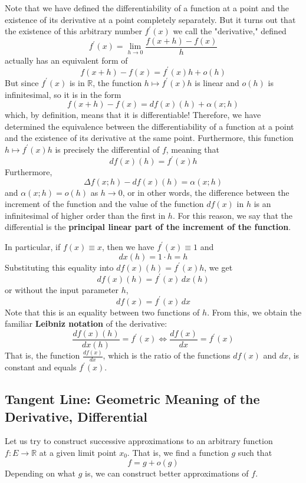   Note that we have defined the differentiability of a function at a point and the existence of its derivative at a point completely separately. But it turns out that the existence of this arbitrary number $f^\prime (x)$ we call the "derivative," defined
  \[f^\prime (x) = \lim_{h \rightarrow 0} \frac{f(x + h) - f(x)}{h}\]
  actually has an equivalent form of 
  \[f(x + h) - f(x) = f^\prime (x) h + o(h)\]
  But since $f^\prime(x)$ is in $\mathbb{R}$, the function $h \mapsto f^\prime (x) h$ is linear and $o(h)$ is infinitesimal, so it is in the form 
  \[f(x + h) - f(x) = df (x) (h) + \alpha(x; h)\]
  which, by definition, means that it is differentiable! Therefore, we have determined the equivalence between the differentiability of a function at a point and the existence of its derivative at the same point. Furthermore, this function $h \mapsto f^\prime (x) h$ is precisely the differential of $f$, meaning that
  \[df (x) (h) = f^\prime (x) h\]
  Furthermore, 
  \[\Delta f(x; h) - df(x)(h) = \alpha (x; h)\]
  and $\alpha(x;h) = o (h)$ as $h \rightarrow 0$, or in other words, the difference between the increment of the function and the value of the function $df(x)$ in $h$ is an infinitesimal of higher order than the first in $h$. For this reason, we say that the differential is the \textbf{principal linear part of the increment of the function}. 

  In particular, if $f(x) \equiv x$, then we have $f^\prime (x) \equiv 1$ and 
  \[dx (h) = 1 \cdot h = h\]
  Substituting this equality into $df(x) (h) = f^\prime (x) h$, we get
  \[df (x) (h) = f^\prime (x) \,dx (h)\]
  or without the input parameter $h$, 
  \[df(x) = f^\prime (x) \,dx\]
  Note that this is an equality between two functions of $h$. From this, we obtain the familiar \textbf{Leibniz notation} of the derivative: 
  \[\frac{df (x) (h)}{dx(h)} = f^\prime (x) \iff \frac{df(x)}{dx} = f^\prime (x)\]
  That is, the function $\frac{df(x)}{dx}$, which is the ratio of the functions $df(x)$ and $dx$, is constant and equals $f^\prime (x)$. 

\subsection{Tangent Line: Geometric Meaning of the Derivative, Differential}

  Let us try to construct successive approximations to an arbitrary function $f: E \longrightarrow \mathbb{R}$ at a given limit point $x_0$. That is, we find a function $g$ such that
  \[f = g + o(g)\]
  Depending on what $g$ is, we can construct better approximations of $f$. 

